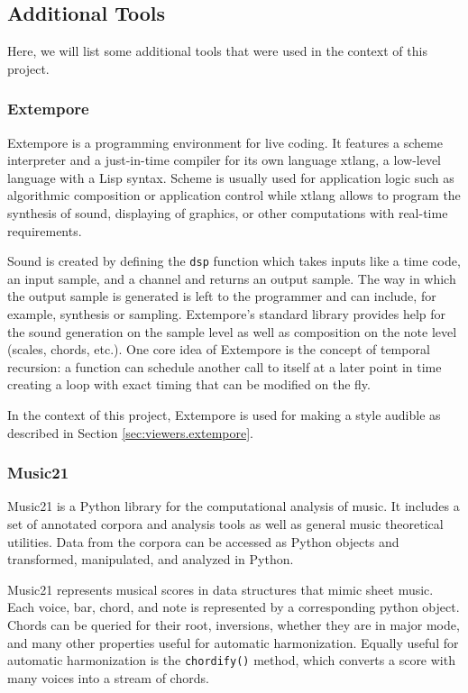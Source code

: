 \subsection{Additional Tools}
\label{sec:tools}

Here, we will list some additional tools that were used in the context of this project.

\subsubsection{Extempore}
\label{sec:tools.extempore}

Extempore \cite{extempore} is a programming environment for live coding.
It features a scheme interpreter and a just-in-time compiler for its own language xtlang, a low-level language with a Lisp syntax.
Scheme is usually used for application logic such as algorithmic composition or application control while xtlang allows to program the synthesis of sound, displaying of graphics, or other computations with real-time requirements.

Sound is created by defining the \texttt{dsp} function which takes inputs like a time code, an input sample, and a channel and returns an output sample.
The way in which the output sample is generated is left to the programmer and can include, for example, synthesis or sampling.
Extempore's standard library provides help for the sound generation on the sample level as well as composition on the note level (scales, chords, etc.).
One core idea of Extempore is the concept of temporal recursion: a function can schedule another call to itself at a later point in time creating a loop with exact timing that can be modified on the fly.

In the context of this project, Extempore is used for making a style audible as described in Section \ref{sec:viewers.extempore}.

\subsubsection{Music21}
\label{sec:tools.music21}

Music21 \cite{music21} is a Python library for the computational analysis of music. It includes a set of annotated corpora and analysis tools as well as general music theoretical utilities. Data from the corpora can be accessed as Python objects and transformed, manipulated, and analyzed in Python.

Music21 represents musical scores in data structures that mimic sheet music. Each voice, bar, chord, and note is represented by a corresponding python object. Chords can be queried for their root, inversions, whether they are in major mode, and many other properties useful for automatic harmonization. Equally useful for automatic harmonization is the \texttt{chordify()} method, which converts a score with many voices into a stream of chords.

